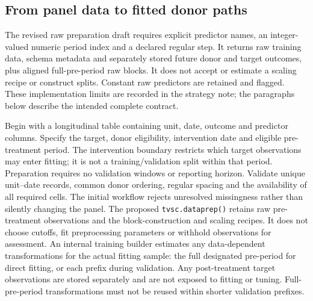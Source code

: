 \documentclass[11pt]{article}
\begin{document}
\subsection{From panel data to fitted donor paths}
The revised raw preparation draft requires explicit predictor names,
an integer-valued numeric period index and a declared regular step.
It returns raw training data, schema metadata and separately stored future
donor and target outcomes, plus aligned full-pre-period raw blocks. It does
not accept or estimate a scaling recipe or construct splits. Constant raw predictors
are retained and flagged. These implementation limits are recorded in the
strategy note; the paragraphs below describe the intended complete contract.

Begin with a longitudinal table containing unit, date, outcome and predictor
columns. Specify the target, donor eligibility, intervention date and
eligible pre-treatment period. The intervention boundary restricts which
target observations may enter fitting; it is not a training/validation
split within that period. Preparation requires no validation windows or
reporting horizon. Validate unique unit--date records, common
donor ordering, regular spacing and the availability of all required cells.
The initial workflow rejects unresolved missingness rather than silently
changing the panel. The proposed \texttt{tvsc.dataprep()} retains raw
pre-treatment observations and the block-construction and scaling recipes.
It does not choose cutoffs, fit preprocessing parameters or withhold
observations for assessment. An internal training builder estimates any
data-dependent transformations for the actual fitting sample: the full
designated pre-period for direct fitting, or each prefix during validation.
Any post-treatment
target observations are stored separately and are not exposed to fitting
or tuning. Full-pre-period transformations must not be reused within
shorter validation prefixes.
\end{document}
